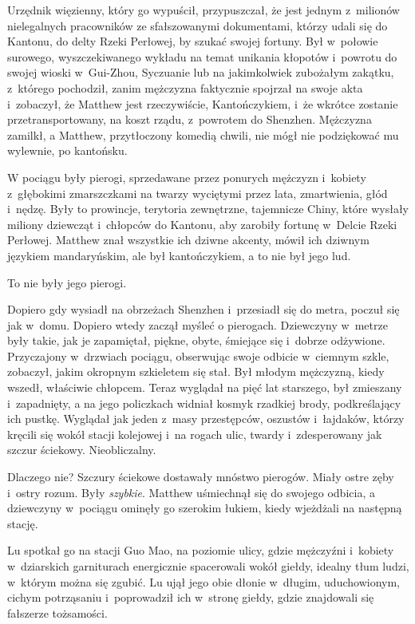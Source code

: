 \documentclass[oneside,polish,11pt,rmheadings]{mwbk}
\begin{document}
Urzędnik więzienny, który go wypuścił, przypuszczał, że jest jednym z~milionów nielegalnych pracowników ze sfałszowanymi dokumentami, którzy udali się do Kantonu, do delty Rzeki Perłowej, by szukać swojej fortuny. Był w~połowie surowego, wyszczekiwanego wykładu na temat unikania kłopotów i~powrotu do swojej wioski w~Gui-Zhou, Syczuanie lub na jakimkolwiek zubożałym zakątku, z~którego pochodził, zanim mężczyzna faktycznie spojrzał na swoje akta i~zobaczył, że Matthew jest rzeczywiście, Kantończykiem, i~że wkrótce zostanie przetransportowany, na koszt rządu, z~powrotem do Shenzhen. Mężczyzna zamilkł, a Matthew, przytłoczony komedią chwili, nie mógł nie podziękować mu wylewnie, po kantońsku.

W pociągu były pierogi, sprzedawane przez ponurych mężczyzn i~kobiety z~głębokimi zmarszczkami na twarzy wyciętymi przez lata, zmartwienia, głód i~nędzę. Były to prowincje, terytoria zewnętrzne, tajemnicze Chiny, które wysłały miliony dziewcząt i~chłopców do Kantonu, aby zarobiły fortunę w~Delcie Rzeki Perłowej. Matthew znał wszystkie ich dziwne akcenty, mówił ich dziwnym językiem mandaryńskim, ale był kantończykiem, a to nie był jego lud.

To nie były jego pierogi.

Dopiero gdy wysiadł na obrzeżach Shenzhen i~przesiadł się do metra, poczuł się jak w~domu. Dopiero wtedy zaczął myśleć o pierogach. Dziewczyny w~metrze były takie, jak je zapamiętał, piękne, obyte, śmiejące się i~dobrze odżywione. Przyczajony w~drzwiach pociągu, obserwując swoje odbicie w~ciemnym szkle, zobaczył, jakim okropnym szkieletem się stał. Był młodym mężczyzną, kiedy wszedł, właściwie chłopcem. Teraz wyglądał na pięć lat starszego, był zmieszany i~zapadnięty, a na jego policzkach widniał kosmyk rzadkiej brody, podkreślający ich pustkę. Wyglądał jak jeden z~masy przestępców, oszustów i~łajdaków, którzy kręcili się wokół stacji kolejowej i~na rogach ulic, twardy i~zdesperowany jak szczur ściekowy. Nieobliczalny.

Dlaczego nie? Szczury ściekowe dostawały mnóstwo pierogów. Miały ostre zęby i~ostry rozum. Były \textit{szybkie}. Matthew uśmiechnął się do swojego odbicia, a dziewczyny w~pociągu ominęły go szerokim łukiem, kiedy wjeżdżali na następną stację.

Lu spotkał go na stacji Guo Mao, na poziomie ulicy, gdzie mężczyźni i~kobiety w~dziarskich garniturach energicznie spacerowali wokół giełdy, idealny tłum ludzi, w~którym można się zgubić. Lu ujął jego obie dłonie w~długim, uduchowionym, cichym potrząsaniu i~poprowadził ich w~stronę giełdy, gdzie znajdowali się fałszerze tożsamości.
\end{document}

